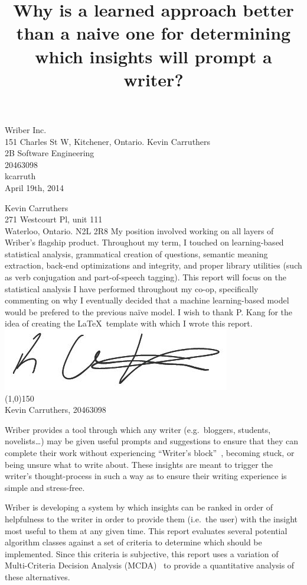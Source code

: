 \documentclass[12pt]{article}
\begin{document}
\title{Why is a learned approach better than a naive one for determining which insights will prompt a writer?}
{
	Wriber Inc.\\
	151 Charles St W, Kitchener, Ontario.
}
{
	Kevin Carruthers\\
	2B Software Engineering\\
	20463098\\
	kcarruth\\
	April 19th, 2014
}


{
	\noindent
	Kevin Carruthers\\
	271 Westcourt Pl, unit 111\\
	Waterloo, Ontario. N2L 2R8
}
{
	My position involved working on all layers of Wriber's flagship product. Throughout my term, I touched on learning-based statistical analysis, grammatical creation of questions, semantic meaning extraction, back-end optimizations and integrity, and proper library utilities (such as verb conjugation and part-of-speech tagging).
}
{
	This report will focus on the statistical analysis I have performed throughout my co-op, specifically commenting on why I eventually decided that a machine learning-based model would be prefered to the previous naïve model.
}
{
	I wish to thank P. Kang for the idea of creating the \LaTeX\ template with which I wrote this report.
}
{
	\includegraphics[scale=0.5]{signature.jpg}\\
	\line(1,0){150}\\
	Kevin Carruthers, 20463098
}


Wriber provides a tool through which any writer (e.g.\ bloggers, students, novelists\dots) may be given useful prompts and suggestions to ensure that they can complete their work without experiencing ``Writer's block''~\cite{kamil}, becoming stuck, or being unsure what to write about. These insights are meant to trigger the writer's thought-process in such a way as to ensure their writing experience is simple and stress-free.

Wriber is developing a system by which insights can be ranked in order of helpfulness to the writer in order to provide them (i.e.\ the user) with the insight most useful to them at any given time. This report evaluates several potential algorithm classes against a set of criteria to determine which should be implemented. Since this criteria is subjective, this report uses a variation of Multi-Criteria Decision Analysis (MCDA)~\cite{mcda} to provide a quantitative analysis of these alternatives.
\end{document}
